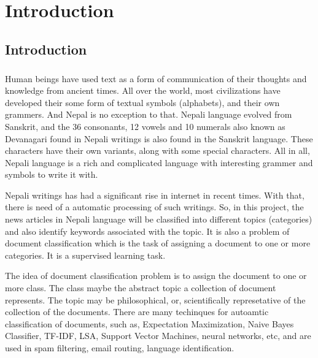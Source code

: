 \documentclass[12pt]{report}
\begin{document}
    

    \newpage

    \tableofcontents
    \newpage
    \chapter{Introduction}
    
    \section{Introduction}
    \paragraph{}
        Human beings have used text as a form of communication of their thoughts and knowledge from ancient times. All over the world, most civilizations have developed their some form of textual symbols 
        (alphabets), and  their own grammers.
        And Nepal is no exception to that. Nepali language evolved from Sanskrit, and the 36 consonants, 12 vowels and 10 numerals also known as Devanagari found in Nepali writings is also found 
        in the Sanskrit language. 
        These characters have their own variants, along with some special characters. All in all, Nepali language is a rich and complicated language with interesting grammer and symbols to write it with.
        
        Nepali writings has had a significant rise in internet in recent times. With that, there is need of a automatic processing of such writings.          
        So, in this project, the news articles in Nepali language will be classified into different topics (categories) and also identify keywords associated with the topic.
        It is also a problem of document classification which is the task of assigning a document to one or more categories. It is a supervised learning task. 

        The idea of document classification problem is to assign the document to one or more class. The class maybe the abstract topic a collection of document represents. The topic may be philosophical, or, scientifically represetative
        of the collection of the documents. There are many techinques for autoamtic classification of documents, such as, Expectation Maximization, Naive Bayes Classifier, TF-IDF, LSA, Support Vector Machines,
        neural networks, etc, and are used in spam filtering, email routing, language identification\cite{wikipedia2021}. 
        
\end{document}
